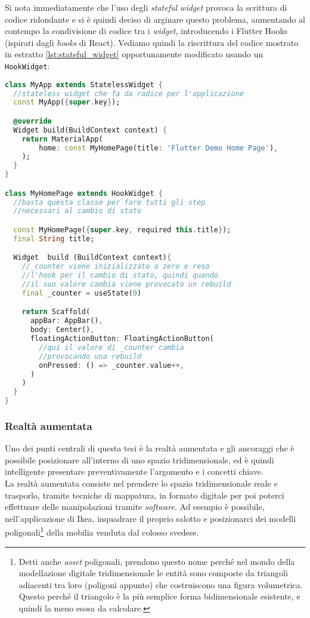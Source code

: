 Si nota immediatamente che l'uso degli \textit{stateful widget} provoca la scrittura di codice ridondante e si è quindi deciso di arginare questo problema, aumentando al contempo la condivisione di codice tra i \textit{widget}, introducendo i Flutter Hooks (ispirati dagli \textit{hooks} di React).
Vediamo quindi la riscrittura del codice mostrato in estratto \ref{lst:stateful_widget} opportunamente modificato usando un \verb+HookWidget+:

\begin{lstlisting}[language=dart, caption={Creazione \textit{hook widget}}]
class MyApp extends StatelessWidget {
  //stateless widget che fa da radice per l'applicazione
  const MyApp({super.key});

  @override
  Widget build(BuildContext context) {
    return MaterialApp(
        home: const MyHomePage(title: 'Flutter Demo Home Page'),
    );
  }
}

class MyHomePage extends HookWidget {
  //basta questa classe per fare tutti gli step
  //necessari al cambio di stato

  const MyHomePage({super.key, required this.title});
  final String title;

  Widget  build (BuildContext context){
    //_counter viene inizializzato a zero e reso
    //l'hook per il cambio di stato, quindi quando
    //il suo valore cambia viene provocato un rebuild
    final _counter = useState(0)

    return Scaffold(
      appBar: AppBar(),
      body: Center(),
      floatingActionButton: FloatingActionButton(
        //qui il valore di _counter cambia
        //provocando una rebuild
        onPressed: () => _counter.value++,
      )
    )
  }
}
\end{lstlisting}

\subsubsection{Realtà aumentata}
Uno dei punti centrali di questa tesi è la realtà aumentata e gli ancoraggi che è possibile posizionare all'interno di uno spazio tridimensionale, ed è quindi intelligente presentare preventivamente l'argomento e i concetti chiave.\\
La realtà aumentata consiste nel prendere lo spazio tridimensionale reale e trasporlo, tramite tecniche di mappatura, in formato digitale per poi poterci effettuare delle manipolazioni tramite \textit{software}. Ad esempio è possibile, nell'applicazione di Ikea, inquadrare il proprio salotto e posizionarci dei modelli poligonali\footnote{Detti anche \textit{asset} poligonali, prendono questo nome perché nel mondo della modellazione digitale tridimensionale le entità sono composte da triangoli adiacenti tra loro (poligoni appunto) che costruiscono una figura volumetrica. Questo perché il triangolo è la più semplice forma bidimensionale esistente, e quindi la meno esosa da calcolare.} della mobilia venduta dal colosso svedese.\\

